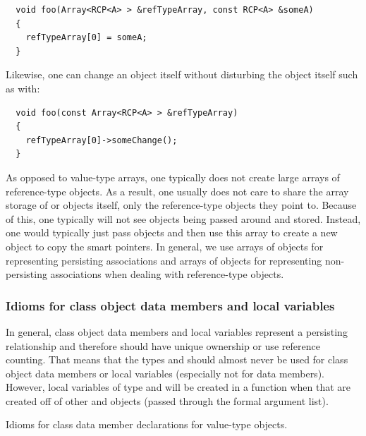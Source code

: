 \documentclass[pdf,ps2pdf,11pt]{SANDreport}
\begin{document}
{\small\begin{verbatim}
  void foo(Array<RCP<A> > &refTypeArray, const RCP<A> &someA)
  {
    refTypeArray[0] = someA;
  }
\end{verbatim}}

Likewise, one can change an {} object itself without disturbing
the {} object itself such as with:

{\small\begin{verbatim}
  void foo(const Array<RCP<A> > &refTypeArray)
  {
    refTypeArray[0]->someChange();
  }
\end{verbatim}}

As opposed to value-type arrays, one typically does not create large
arrays of reference-type objects.  As a result, one usually does not
care to share the array storage of {} or {} objects
itself, only the reference-type objects they point to.  Because of
this, one typically will not see {} objects being passed around and stored.  Instead, one would
typically just pass {} objects
and then use this array to create a new {} object to copy the smart pointers.  In general, we
use arrays of {} objects for representing persisting
associations and arrays of {} objects for representing
non-persisting associations when dealing with reference-type objects.


%
{}\subsubsection{Idioms for class object data members and local
variables}
%

In general, class object data members and local variables represent a
persisting relationship and therefore should have unique ownership or
use reference counting.  That means that the types {} and
{} should almost never be used for class object data
members or local variables (especially not for data members).
However, local variables of type {} and
{} will be created in a function when that are
created off of other {} and {} objects
(passed through the formal argument list).

\begin{table}
%
\begin{center}
%
%

%
%
\end{center}
\caption{\label{fig:data_member_value_type}
Idioms for class data member declarations for value-type objects.}
%
\end{table}
\end{document}
